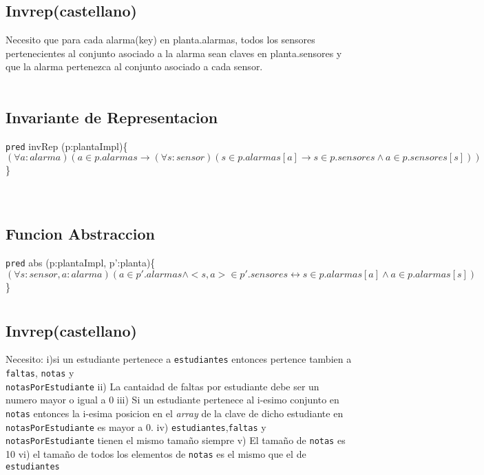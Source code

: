 \documentclass{article}
\newcommand{\invRep}[2]{\noindent\texttt{pred} invRep (#1)\{$#2$\}\\}
\newcommand{\abst}[2]{\noindent\texttt{pred} abs (#1)\{$#2$\}\\}
\begin{document}
\section{}

\subsection{Invrep(castellano)}

Necesito que para cada alarma(key) en planta.alarmas, todos los sensores pertenecientes
al conjunto asociado a la alarma sean claves en planta.sensores y que la alarma pertenezca al conjunto
asociado a cada sensor.\\\\

\subsection{Invariante de Representacion}
\invRep{p:plantaImpl}{(\forall a:alarma)(a\in p.alarmas\to (\forall s:sensor)(s\in p.alarmas[a]\to s\in p.sensores \land a\in p.sensores[s]))}\\\\
\subsection{Funcion Abstraccion}
\abst{p:plantaImpl, p':planta}{(\forall s:sensor,a:alarma)(a\in p'.alarmas\land <s,a>\in p'.sensores\leftrightarrow s\in p.alarmas[a]\land a\in p.alarmas[s])}


\section{}

\subsection{Invrep(castellano)}
Necesito: i)si un estudiante pertenece a \texttt{estudiantes} entonces pertence tambien a
\texttt{faltas}, \texttt{notas} y\\ \texttt{notasPorEstudiante} ii) La cantaidad de faltas
por estudiante debe ser un numero mayor o igual a 0 iii) Si un estudiante pertenece al i-esimo
conjunto en \texttt{notas} entonces la i-esima posicion en el \textit{array} de la clave de
dicho estudiante en \texttt{notasPorEstudiante} es mayor a 0. iv) \texttt{estudiantes},\texttt{faltas} y \texttt{notasPorEstudiante}
tienen el mismo tamaño siempre v) El tamaño de \texttt{notas} es 10 vi) el tamaño de todos
los elementos de \texttt{notas} es el mismo que el de \texttt{estudiantes}
\end{document}
